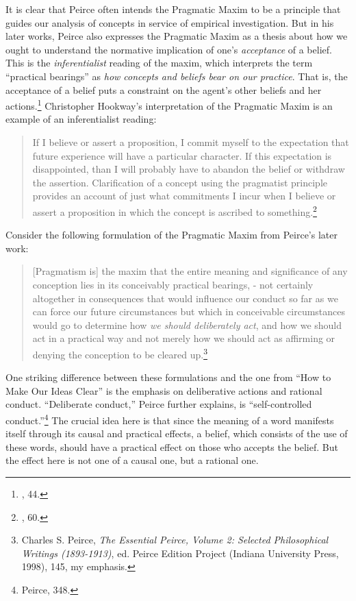 It is clear that Peirce often intends the Pragmatic Maxim to be a
principle that guides our analysis of concepts in service of empirical
investigation. But in his later works, Peirce also expresses the
Pragmatic Maxim as a thesis about how we ought to understand the
normative implication of one's \emph{acceptance} of a belief. This is
the \emph{inferentialist} reading of the maxim, which interprets the
term ``practical bearings'' as \emph{how concepts and beliefs bear on
our practice}. That is, the acceptance of a belief puts a constraint on
the agent's other beliefs and her actions.\footnote{\cite{whatpragwas}, 44.} Christopher Hookway's interpretation of the
Pragmatic Maxim is an example of an inferentialist reading:

\begin{quote}
If I believe or assert a proposition, I commit myself to the expectation
that future experience will have a particular character. If this
expectation is disappointed, than I will probably have to abandon the
belief or withdraw the assertion. Clarification of a concept using the
pragmatist principle provides an account of just what commitments I
incur when I believe or assert a proposition in which the concept is
ascribed to something.\footnote{\cite{hookway1}, 60.}
\end{quote}

Consider the following formulation of the Pragmatic Maxim from Peirce's
later work:

\begin{quote}
{[}Pragmatism is{]} the maxim that the entire meaning and significance
of any conception lies in its conceivably practical bearings, - not
certainly altogether in consequences that would influence our conduct so
far as we can force our future circumstances but which in conceivable
circumstances would go to determine how \emph{we should deliberately
act}, and how we should act in a practical way and not merely how we
should act as affirming or denying the conception to be cleared
up.\footnote{Charles S. Peirce, \emph{The Essential Peirce, Volume 2:
  Selected Philosophical Writings (1893-1913)}, ed. Peirce Edition
  Project (Indiana University Press, 1998), 145, my emphasis.}
\end{quote}

One striking difference between these formulations and the one from
``How to Make Our Ideas Clear'' is the emphasis on deliberative actions and
rational conduct. ``Deliberate conduct,'' Peirce further explains, is
``self-controlled conduct.''\footnote{Peirce, 348.} The crucial idea
here is that since the meaning of a word manifests itself through its
causal and practical effects, a belief, which consists of the use of
these words, should have a practical effect on those who accepts the
belief. But the effect here is not one of a causal one, but a rational
one.

